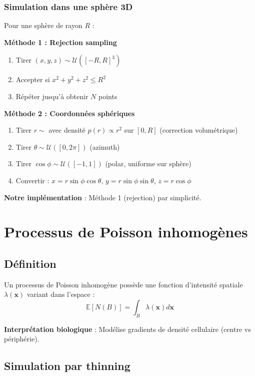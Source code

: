 \subsubsection{Simulation dans une sphère 3D}

Pour une sphère de rayon $R$ :

\textbf{Méthode 1 : Rejection sampling}
\begin{enumerate}
    \item Tirer $(x, y, z) \sim \mathcal{U}([-R, R]^3)$
    \item Accepter si $x^2 + y^2 + z^2 \leq R^2$
    \item Répéter jusqu'à obtenir $N$ points
\end{enumerate}

\textbf{Méthode 2 : Coordonnées sphériques}
\begin{enumerate}
    \item Tirer $r \sim$ avec densité $p(r) \propto r^2$ sur $[0, R]$ (correction volumétrique)
    \item Tirer $\theta \sim \mathcal{U}([0, 2\pi])$ (azimuth)
    \item Tirer $\cos\phi \sim \mathcal{U}([-1, 1])$ (polar, uniforme sur sphère)
    \item Convertir : $x = r\sin\phi\cos\theta$, $y = r\sin\phi\sin\theta$, $z = r\cos\phi$
\end{enumerate}

\textbf{Notre implémentation} : Méthode 1 (rejection) par simplicité.

\section{Processus de Poisson inhomogènes}

\subsection{Définition}

Un processus de Poisson inhomogène possède une fonction d'intensité spatiale $\lambda(\mathbf{x})$ variant dans l'espace :
\[
\mathbb{E}[N(B)] = \int_B \lambda(\mathbf{x}) d\mathbf{x}
\]

\textbf{Interprétation biologique} : Modélise gradients de densité cellulaire (centre vs périphérie).

\subsection{Simulation par thinning}

